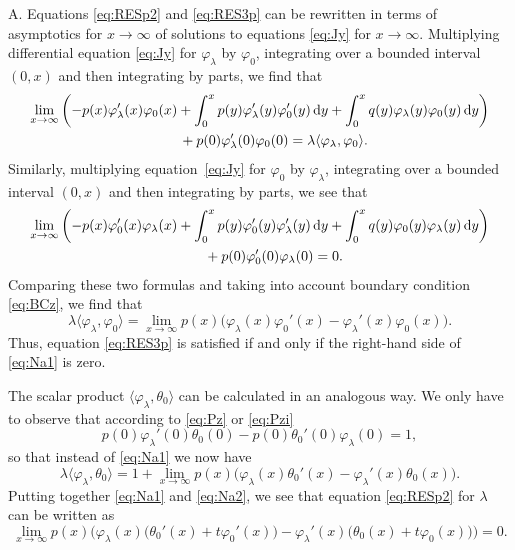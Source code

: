 \documentclass[pdftex]{sigma}%
\numberwithin{equation}{section}
\begin{document}
 A. Equations \eqref{eq:RESp2} and \eqref{eq:RES3p} can be rewritten in terms of asymptotics for $x\to\infty$ of solutions to equations \eqref{eq:Jy} for $x\to\infty$.
 Multiplying differential equation \eqref{eq:Jy} for $\varphi_{\lambda}
 $ by $\varphi_{0}$, integrating over a bounded interval $(0,x)$ and then integrating by parts, we find that
 \begin{gather*}
 \lim_{x\to\infty} \bigg( {-}p(x) \varphi_{\lambda}' (x)\varphi_{0}(x)+\int_{0}^x p(y) \varphi_{\lambda}' (y)\varphi_{0}' (y)\,{\rm d}y
 +\int_{0}^x q(y) \varphi_{\lambda} (y) \varphi_{0} (y)\,{\rm d}y\bigg)
 \\
 \qquad{} + p(0) \varphi_{\lambda}' (0)\varphi_{0}(0) =\lambda\langle \varphi_{\lambda},\varphi_{0}\rangle.
 \end{gather*}
 Similarly, multiplying equation~\eqref{eq:Jy} for $\varphi_{0}$ by $\varphi_{\lambda}$, integrating over a bounded interval $(0,x)$ and then integrating by parts, we see that
 \begin{gather*}
 \lim_{x\to\infty} \bigg( {-}p(x) \varphi_{0}' (x)\varphi_{\lambda}(x)+\int_{0}^x p(y) \varphi_{0}' (y) \varphi_{\lambda}' (y)\,{\rm d}y
 +\int_{0}^x q(y) \varphi_{0} (y)\varphi_{\lambda} (y)\,{\rm d}y\bigg)
 \\
 \qquad{} + p(0) \varphi_{0}' (0)\varphi_{\lambda}(0)=0.
 \end{gather*}
 Comparing these two formulas and taking into account boundary condition \eqref{eq:BCz}, we find that
 \begin{equation}
 \lambda\langle \varphi_{\lambda},\varphi_{0}\rangle = \lim_{x\to\infty} p(x) \big( \varphi_{\lambda} (x)\varphi_{0}'(x) - \varphi_{\lambda}' (x)\varphi_{0}(x)\big).
 \label{eq:Na1}\end{equation}
 Thus, equation \eqref{eq:RES3p} is satisfied if and only if the right-hand side of \eqref{eq:Na1} is zero.

 The scalar product $\langle \varphi_{\lambda}, \theta_{0}\rangle$ can be calculated in an analogous way. We only have to observe that according to \eqref{eq:Pz} or \eqref{eq:Pzi}
 \[
 p(0) \varphi_{\lambda}'(0) \theta_{0} (0) - p(0) \theta_{0}' (0)\varphi_{\lambda}(0) =1,
 \]
 so that instead of \eqref{eq:Na1} we now have
 \begin{equation}
 \lambda\langle \varphi_{\lambda},\theta_{0}\rangle = 1+ \lim_{x\to\infty} p(x) \big( \varphi_{\lambda} (x)\theta_{0}'(x) - \varphi_{\lambda}' (x)\theta_{0}(x)\big).
 \label{eq:Na2}\end{equation}
 Putting together \eqref{eq:Na1} and \eqref{eq:Na2}, we see that equation \eqref{eq:RESp2} for $\lambda$ can be written as
 \[
 \lim_{x\to\infty} p(x) \big( \varphi_{\lambda} (x)\big(\theta_{0}'(x) + t\varphi_{0}'(x)\big)- \varphi_{\lambda}' (x) \big(\theta_{0}(x) + t\varphi_{0}(x)\big) \big)=0.
 \]
\end{document}
